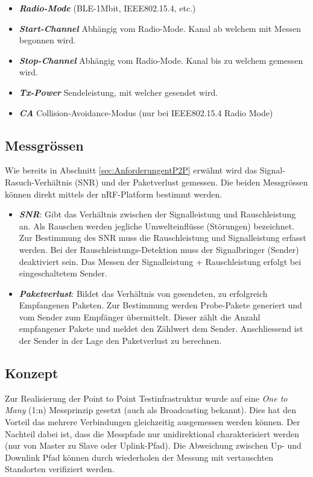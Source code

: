 \begin{itemize}
	\item \textit{\textbf{Radio-Mode}} (BLE-1Mbit, IEEE802.15.4, etc.)
	\item \textit{\textbf{Start-Channel}} Abhängig vom Radio-Mode. Kanal ab welchem mit Messen begonnen wird.
	\item \textit{\textbf{Stop-Channel}} Abhängig vom Radio-Mode. Kanal bis zu welchem gemessen wird. 
	\item \textit{\textbf{Tx-Power}} Sendeleistung, mit welcher gesendet wird. 
	\item \textit{\textbf{CA}} Collision-Avoidance-Modus (nur bei IEEE802.15.4 Radio Mode)
\end{itemize}


\subsection{Messgrössen}\label{sec:MessgrössenP2P}

Wie bereits in Abschnitt \ref{sec:AnforderungentP2P} erwähnt wird das Signal-Rasuch-Verhältnis (SNR) und der Paketverlust gemessen. Die beiden Messgrössen können direkt mittels der nRF-Platform bestimmt werden.

\begin{itemize}
	\item \textbf{\textit{SNR}}: Gibt das Verhältnis zwischen der Signalleistung und Rauschleistung an. Als Rauschen werden jegliche Umwelteinflüsse (Störungen) bezeichnet. Zur Bestimmung des SNR muss die Rauschleistung und Signalleistung erfasst werden. Bei der Rauschleistungs-Detektion muss der Signalbringer (Sender) deaktiviert sein. Das Messen der Signalleistung + Rauschleistung erfolgt bei eingeschaltetem Sender.
	\item \textbf{\textit{Paketverlust}}: Bildet das Verhältnis von gesendeten, zu erfolgreich Empfangenen Paketen. Zur Bestimmung werden Probe-Pakete generiert und vom Sender zum Empfänger übermittelt. Dieser zählt die Anzahl empfangener Pakete und meldet den Zählwert dem Sender. Anschliessend ist der Sender in der Lage den Paketverlust zu berechnen. 
\end{itemize} 


\subsection{Konzept}\label{sec:KonzeptP2P}

Zur Realisierung der Point to Point Testinfrastruktur wurde auf eine \textit{One to Many} (1:n) Messprinzip gesetzt (auch als Broadcasting bekannt). Dies hat den Vorteil das mehrere Verbindungen gleichzeitig ausgemessen werden können. Der Nachteil dabei ist, dass die Messpfade nur unidirektional charakterisiert werden (nur von Master zu Slave oder Uplink-Pfad). Die Abweichung zwischen Up- und Downlink Pfad können durch wiederholen der Messung mit vertauschten Standorten verifiziert werden. 


